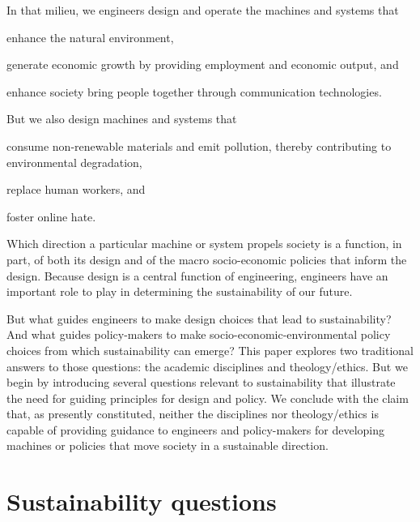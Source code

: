 \documentclass[12pt]{article}
\begin{document}
In that milieu, 
we engineers design and operate the machines and systems that
%
\begin{enumerate*}[label={(\alph*)}]

  \item enhance the natural environment,

  \item generate economic growth by providing employment and economic output, and

  \item enhance society bring people together through communication technologies.

\end{enumerate*}
%
But we also design machines and systems that
%
\begin{enumerate*}[label={(\alph*)}]

  \item consume non-renewable materials and
        emit pollution, thereby contributing to environmental degradation,

  \item replace human workers, and

  \item foster online hate.        

\end{enumerate*}
%
Which direction a particular machine or system propels society is a function, in part,
of both its design and of the macro socio-economic policies that inform the design.
Because design is a central function of engineering, 
engineers have an important role to play in determining 
the sustainability of our future. 

But what guides engineers to make design choices that lead to sustainability?
And what guides policy-makers to make socio-economic-environmental
policy choices from which sustainability can emerge?
This paper explores two traditional answers to those questions:
the academic disciplines and theology/ethics.
But we begin by introducing several questions relevant to sustainability
that illustrate the need for guiding principles for design and policy.
We conclude with the claim that, as presently constituted, 
neither the disciplines nor theology/ethics is capable of providing
guidance to engineers and policy-makers
for developing machines or policies that move society in a sustainable direction.


\section{Sustainability questions}
\label{sec:sustainability_questions}
\end{document}

